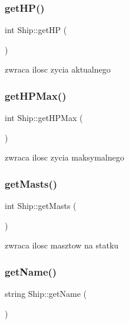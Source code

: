 \subsubsection{\texorpdfstring{get\+H\+P()}{getHP()}}
{\footnotesize\ttfamily int Ship\+::get\+HP (\begin{DoxyParamCaption}{ }\end{DoxyParamCaption})\hspace{0.3cm}{\ttfamily [inline]}}



zwraca ilosc zycia aktualnego 

\mbox{\label{class_ship_accc55a9b14a92fb41ac2d3ebe80e23e5}} 
\subsubsection{\texorpdfstring{get\+H\+P\+Max()}{getHPMax()}}
{\footnotesize\ttfamily int Ship\+::get\+H\+P\+Max (\begin{DoxyParamCaption}{ }\end{DoxyParamCaption})\hspace{0.3cm}{\ttfamily [inline]}}



zwraca ilosc zycia maksymalnego 

\mbox{\label{class_ship_a937ffa88e426e8b0bb0006314111d1d2}} 
\subsubsection{\texorpdfstring{get\+Masts()}{getMasts()}}
{\footnotesize\ttfamily int Ship\+::get\+Masts (\begin{DoxyParamCaption}{ }\end{DoxyParamCaption})\hspace{0.3cm}{\ttfamily [inline]}}



zwraca ilosc masztow na statku 

\mbox{\label{class_ship_a70faa1b6274d9b9303d263e51071b29a}} 
\subsubsection{\texorpdfstring{get\+Name()}{getName()}}
{\footnotesize\ttfamily string Ship\+::get\+Name (\begin{DoxyParamCaption}{ }\end{DoxyParamCaption})\hspace{0.3cm}{\ttfamily [inline]}}



